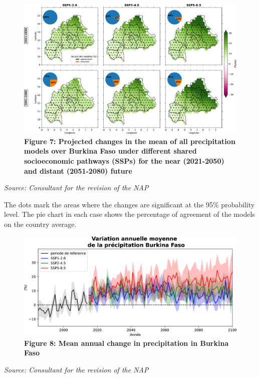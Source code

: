 \documentclass[
]{book}
\begin{document}
\begin{figure}
\centering
\includegraphics{Figures and Photos/Figure 7.png}
\caption{\textbf{Figure 7: Projected changes in the mean of all precipitation models over Burkina Faso under different shared socioeconomic pathways (SSPs) for the near (2021-2050) and distant (2051-2080) future}}
\end{figure}

\emph{Source: Consultant for the revision of the NAP}

The dots mark the areas where the changes are significant at the 95\% probability level. The pie chart in each case shows the percentage of agreement of the models on the country average.

\begin{figure}
\centering
\includegraphics{Figures and Photos/Figure 8.png}
\caption{\textbf{Figure 8: Mean annual change in precipitation in Burkina Faso}}
\end{figure}

\emph{Source: Consultant for the revision of the NAP}
\end{document}
